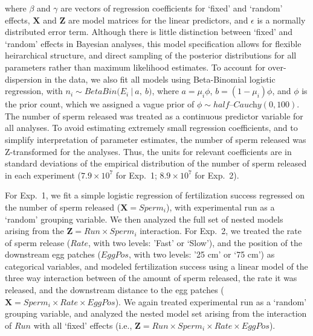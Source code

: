 \documentclass{article}
\begin{document}
	\noindent where $\beta$ and $\gamma$ are vectors of regression coefficients for `fixed' and `random' effects, $\mathbf{X}$ and $\mathbf{Z}$ are model matrices for the linear predictors, and $\epsilon$ is a normally distributed error term. Although there is little distinction between `fixed' and `random' effects in Bayesian analyses, this model specification allows for flexible heirarchical structure, and direct sampling of the posterior distributions for all parameters rather than maximum likelihood estimates. To account for over-dispersion in the data, we also fit all models using Beta-Binomial logistic regression, with $n_i \sim BetaBin\Big(E_i~|~a,~b\Big)$, where $a = \mu_i \phi$, $b = (1 - \mu_i) \phi$, and $\phi$ is the prior count, which we assigned a vague prior of $\phi \sim \mathit{half} \text{--} \textit{Cauchy}(0,100)$. The number of sperm released was treated as a continuous predictor variable for all analyses. To avoid estimating extremely small regression coefficients, and to simplify interpretation of parameter estimates, the number of sperm released was Z-transformed for the analyses. Thus, the units for relevant coefficients are in standard deviations of the empirical distribution of the number of sperm released in each experiment ($7.9 \times 10^{7}$ for Exp.~1; $8.9 \times 10^{7}$ for Exp.~2). 

	For Exp.~1, we fit a simple logistic regression of fertilization success regressed on the number of sperm released ($\mathbf{X} = Sperm_i$), with experimental run as a `random' grouping variable. We then analyzed the full set of nested models arising from the $\mathbf{Z} = Run \times Sperm_i$ interaction. For Exp.~2, we treated the rate of sperm release ($Rate$, with two levels: 'Fast' or `Slow'), and the position of the downstream egg patches ($EggPos$, with two levels: '25 cm' or `75 cm') as categorical variables, and modeled fertilization success using a linear model of the three way interaction between of the amount of sperm released, the rate it was released, and the downstream distance to the egg patches ($ \mathbf{X} = Sperm_i \times Rate \times EggPos$). We again treated experimental run as a `random' grouping variable, and analyzed the nested model set arising from the interaction of $Run$ with all `fixed' effects (i.e., $\mathbf{Z} = Run \times Sperm_i \times Rate \times EggPos$).
\end{document}
